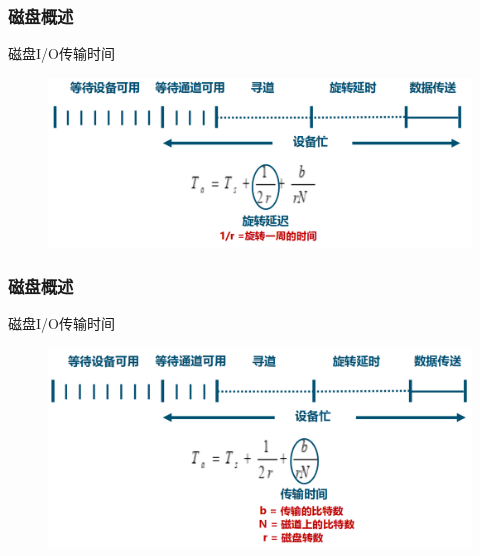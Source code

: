 \begin{frame}[fragile]
    \frametitle{磁盘概述}
    磁盘I/O传输时间
    \begin{figure}
        \includegraphics[width=0.8\linewidth]{figs/disk-time3.png}
    \end{figure}
\end{frame}

\begin{frame}[fragile]
    \frametitle{磁盘概述}
    磁盘I/O传输时间
    \begin{figure}
        \includegraphics[width=0.8\linewidth]{figs/disk-time4.png}
    \end{figure}
\end{frame}

